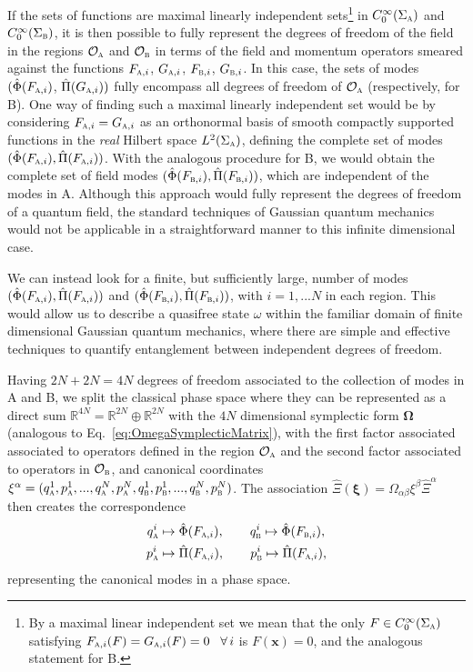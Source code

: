 \documentclass[letterpaper,12pt,titlepage,oneside,final]{book}
\newcommand{\tc}[1]{\textsc{#1}}
\begin{document}
If the sets of functions are maximal linearly independent sets\footnote{By a maximal linear independent set we mean that the only $F\in C_0^\infty(\Sigma_\tc{a})$ satisfying $F_{\tc{a},i}(F) = G_{\tc{a},i}(F) = 0 \,\,\,\,\,\forall\, i$ is $F(\bm x) = 0$, and the analogous statement for B.} in $C_0^\infty(\Sigma_\tc{a})$ and $C_0^\infty(\Sigma_\tc{b})$, it is then possible to fully represent the degrees of freedom of the field in the regions $\mathcal{O}_\tc{a}$ and $\mathcal{O}_\tc{b}$ in terms of the field and momentum operators smeared against the functions $F_{\tc{a},i}$, $G_{\tc{a},i}$, $F_{\tc{b},i}$, $G_{\tc{b},i}$. In this case, the sets of modes $(\hat{\Phi}(F_{\tc{a},i})$, $\hat{\Pi}(G_{\tc{a},i}))$ fully encompass all degrees of freedom of $\mathcal{O}_\tc{a}$ (respectively, for B). One way of finding such a maximal linearly independent set would be by considering $F_{\tc{a},i} = G_{\tc{a},i}$ as an orthonormal basis of smooth compactly supported functions in the \textit{real} Hilbert space $L^2(\Sigma_\tc{a})$, defining the complete set of modes $(\hat{\Phi}(F_{\tc{a},i}), \hat{\Pi}(F_{\tc{a},i}))$. With the analogous procedure for B, we would obtain the complete set of field modes $(\hat{\Phi}(F_{\tc{b},i}), \hat{\Pi}(F_{\tc{b},i}))$, which are independent of the modes in A. Although this approach would fully represent the degrees of freedom of a quantum field, the standard techniques of Gaussian quantum mechanics would not be applicable in a straightforward manner to this infinite dimensional case.

We can instead look for a finite, but sufficiently large, number of modes $(\hat{\Phi}(F_{\tc{a},i}), \hat{\Pi}(F_{\tc{a},i}))$ and $(\hat{\Phi}(F_{\tc{b},i}), \hat{\Pi}(F_{\tc{b},i}))$, with $i=1,...N$ in each region. This would allow us to describe a quasifree state $\omega$ within the familiar domain of finite dimensional Gaussian quantum mechanics, where there are simple and effective techniques to quantify entanglement between independent degrees of freedom.

Having $2N + 2N = 4N$ degrees of freedom associated to the collection of modes in A and B, we split the classical phase space where they can be represented as a direct sum $\mathbb{R}^{4N} = \mathbb{R}^{2N}\oplus \mathbb{R}^{2N}$ with the $4N$ dimensional symplectic form $\bm \Omega$ (analogous to Eq.~\eqref{eq:OmegaSymplecticMatrix}), with the first factor associated associated to operators defined in the region $\mathcal{O}_\tc{a}$ and the second factor associated to operators in $\mathcal{O}_\tc{b}$, and canonical coordinates $\xi^\alpha = (q_\tc{a}^1,p_{\tc{a}}^1,...,q_\tc{a}^N,p_{\tc{a}}^N,q_\tc{b}^1,p_{\tc{b}}^1,...,q_\tc{b}^N,p_{\tc{b}}^N)$. The association $\hat{\Xi}(\bm \xi) = \Omega_{\alpha\beta}\xi^\beta \hat{\Xi}^\alpha$ then creates the correspondence 
\begin{align}
    q_\tc{a}^i&\mapsto \hat{\Phi}(F_{\tc{a},i}), \quad\quad q_\tc{b}^i\mapsto \hat{\Phi}(F_{\tc{b},i}),\\
    p_\tc{a}^i&\mapsto \hat{\Pi}(F_{\tc{a},i}),  \quad\quad p_\tc{b}^i\mapsto \hat{\Pi}(F_{\tc{a},i}),
\end{align}
representing the canonical modes in a phase space.
\end{document}
